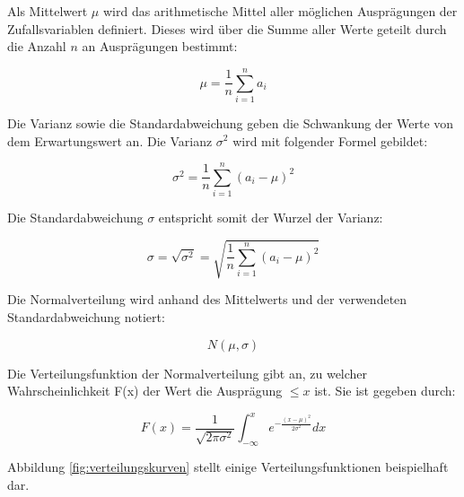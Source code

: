 Als Mittelwert $\mu$ wird das arithmetische Mittel aller möglichen Ausprägungen der Zufallsvariablen definiert. Dieses wird über die Summe aller Werte geteilt durch die Anzahl $n$ an Ausprägungen bestimmt:

\begin{equation}
\mu = \frac{1}{n} \sum_{i=1}^n a_i
\end{equation}

\pagebreak

Die Varianz sowie die Standardabweichung geben die Schwankung der Werte von dem Erwartungswert an.
Die Varianz $\sigma^2$ wird mit folgender Formel gebildet:

\begin{equation}
\sigma^2 = \frac{1}{n} \sum_{i=1}^n (a_i-\mu)^2
\end{equation}

Die Standardabweichung $\sigma$ entspricht somit der Wurzel der Varianz:

\begin{equation}
\sigma = \sqrt{\sigma^2} = \sqrt{\frac{1}{n} \sum_{i=1}^n (a_i-\mu)^2}
\end{equation}

Die Normalverteilung wird anhand des Mittelwerts und der verwendeten Standardabweichung notiert:

\begin{equation}
N(\mu, \sigma)
\end{equation}

Die Verteilungsfunktion der Normalverteilung gibt an, zu welcher Wahrscheinlichkeit F(x) der Wert die Ausprägung $\le x$ ist. Sie ist gegeben durch:

\begin{equation}
F(x) = \frac{1}{\sqrt{2 \pi \sigma^2}} \int_{-\infty}^x e^{-\frac{(x-\mu)^2}{2 \sigma^2}} dx
\end{equation}

Abbildung \ref{fig:verteilungskurven} stellt einige Verteilungsfunktionen beispielhaft dar.

